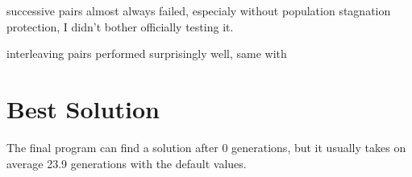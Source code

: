 \documentclass[a4paper,11pt]{article}
\begin{document}
successive pairs almost always failed, especialy without population stagnation protection, I didn't bother officially testing it.

interleaving pairs performed surprisingly well, same with 

\section*{Best Solution}
The final program can find a solution after 0 generations, but it usually takes on average 23.9 generations with the default values.

\pagebreak
\addtolength{\oddsidemargin}{-.875in}
\addtolength{\evensidemargin}{-.875in}
\addtolength{\textwidth}{3in}
\pagestyle{empty}

\end{document}
